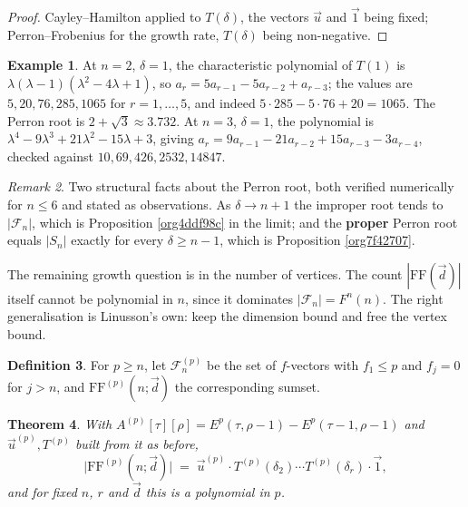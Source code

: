 \documentclass[11pt, a4paper, abstract=yes]{scrartcl}
\theoremstyle{definition}
\newtheorem{definition}{Definition}
\newtheorem{mexample}[definition]{Example}
\theoremstyle{remark}
\newtheorem{remark}[definition]{Remark}
\theoremstyle{plain}
\newtheorem{theorem}[definition]{Theorem}
\newcommand{\vek}[1]{\boldsymbol{#1}}
\renewcommand{\vek}[1]{\vec{#1}}
\begin{document}
\begin{proof}
Cayley--Hamilton applied to \(T(\delta)\), the vectors \(\vek u\) and \(\vek 1\) being fixed;
Perron--Frobenius for the growth rate, \(T(\delta)\) being non-negative.
\end{proof}

\begin{mexample}
At \(n=2\), \(\delta=1\), the characteristic polynomial of \(T(1)\) is
\(\lambda(\lambda-1)(\lambda^2-4\lambda+1)\), so \(a_r=5a_{r-1}-5a_{r-2}+a_{r-3}\); the values are
\(5,20,76,285,1065\) for \(r=1,\dots,5\), and indeed \(5\cdot285-5\cdot76+20=1065\). The Perron root
is \(2+\sqrt3\approx3.732\). At \(n=3\), \(\delta=1\), the polynomial is
\(\lambda^4-9\lambda^3+21\lambda^2-15\lambda+3\), giving
\(a_r=9a_{r-1}-21a_{r-2}+15a_{r-3}-3a_{r-4}\), checked against \(10,69,426,2532,14847\).
\label{orgb96524e}
\end{mexample}

\begin{remark}
Two structural facts about the Perron root, both verified numerically for \(n\le6\) and stated as
observations. As \(\delta\to n+1\) the improper root tends to \(|\mathcal F_n|\), which is
Proposition \ref{org4ddf98c} in the limit; and the \textbf{proper} Perron root equals \(|S_n|\) exactly for
every \(\delta\ge n-1\), which is Proposition \ref{org7f42707}.
\label{org587fcb9}
\end{remark}

The remaining growth question is in the number of vertices. The count \(|\mathrm{FF}(\vek d)|\) itself
cannot be polynomial in \(n\), since it dominates \(|\mathcal F_n|=F^n(n)\). The right generalisation
is Linusson's own: keep the dimension bound and free the vertex bound.

\begin{definition}
For \(p\ge n\), let \(\mathcal F_n^{(p)}\) be the set of \(f\)-vectors with \(f_1\le p\) and
\(f_j=0\) for \(j>n\), and \(\mathrm{FF}^{(p)}(n;\vek d)\) the corresponding sumset.
\label{orgbf5507f}
\end{definition}

\begin{theorem}
With \(A^{(p)}[\tau][\rho]=E^p(\tau,\rho-1)-E^p(\tau-1,\rho-1)\) and \(\vek u^{(p)},T^{(p)}\) built from it
as before,
\[
  \lvert\mathrm{FF}^{(p)}(n;\vek d)\rvert\;=\;\vek u^{(p)}\cdot T^{(p)}(\delta_2)\cdots T^{(p)}(\delta_r)\cdot\vek 1 ,
\]
and for fixed \(n\), \(r\) and \(\vek d\) this is a polynomial in \(p\).
\label{org852a59c}
\end{theorem}
\end{document}
